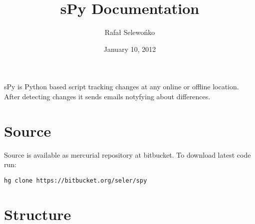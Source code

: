 \documentclass[letterpaper,10pt,english]{sphinxmanual}
\title{sPy Documentation}
\date{January 10, 2012}
\author{Rafał Selewońko}
\begin{document}
\maketitle
\tableofcontents
{}\label{index::doc}


sPy is Python based script tracking changes at any online or offline location.
After detecting changes it sends emails notyfying about differences.


\chapter{Source}
\label{index:welcome-to-spy-s-documentation}\label{index:source}
Source is available as mercurial repository at bitbucket. To download latest code run:

\begin{Verbatim}[commandchars=\\\{\}]
hg clone https://bitbucket.org/seler/spy
\end{Verbatim}


\chapter{Structure}
\label{index:structure}\label{index:module-spy}
\end{document}
